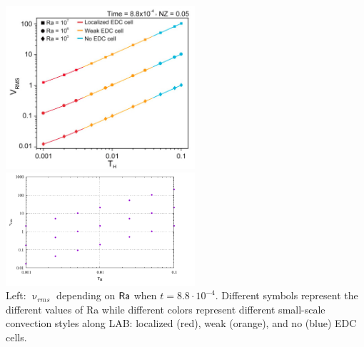 \begin{center}
\includegraphics[width=7cm]{python_codes/fieldstone_168/images/kiso20d.jpg}
\includegraphics[width=7cm]{python_codes/fieldstone_168/results/vrms_final.pdf}\\
{\captionfont 
Left: $\upnu_{rms}$ depending on ${\mathsf{Ra}}$ when $t=8.8\cdot10^{-4}$. 
Different symbols represent the
different values of Ra while different colors represent different small-scale
convection styles along LAB: localized (red), weak (orange), and no (blue) EDC
cells.}
\end{center}








